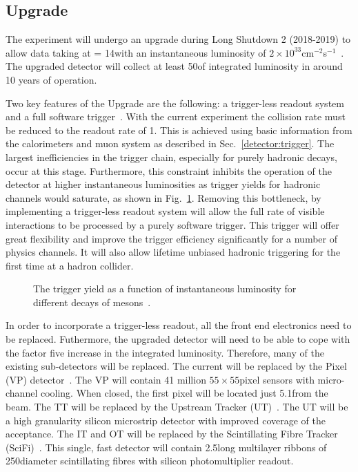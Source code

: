\subsection{\lhcb Upgrade}
\label{sec:lhcb:lhcb-upgrade}

The \lhcb experiment will undergo an upgrade during Long Shutdown 2 (2018-2019) to allow data taking at \sqs = 14\tev with an instantaneous luminosity of $2\times10^{33}$cm$^{-2}$s$^{-1}$~\cite{upgrade-loi,upgrade-tdr}. The upgraded detector will collect at least 50\invfb of integrated luminosity in around 10 years of operation.

Two key features of the \lhcb Upgrade are the following: a trigger-less readout system and a full software trigger~\cite{upgrade-trigger-tdr}. With the current experiment the collision rate must be reduced to the readout rate of 1\mhz. This is achieved using basic information from the calorimeters and muon system as described in Sec.~\ref{detector:trigger}. The largest inefficiencies in the trigger chain, especially for purely hadronic decays, occur at this stage. Furthermore, this constraint inhibits the operation of the detector at higher instantaneous luminosities as trigger yields for hadronic channels would saturate, as shown in Fig.~\ref{fig:upgrade-motivation}. Removing this bottleneck, by implementing a trigger-less readout system will allow the full rate of visible interactions to be processed by a purely software trigger. This trigger will offer great flexibility and improve the trigger efficiency significantly for a number of physics channels. It will also allow lifetime unbiased hadronic triggering for the first time at a hadron collider.

\begin{figure}[!htb]
\centering
{}
\caption{The trigger yield as a function of instantaneous luminosity for different decays of \B mesons~\cite{upgrade-loi}.}
\label{fig:upgrade-motivation}
\end{figure}

In order to incorporate a trigger-less readout, all the front end electronics need to be replaced. Futhermore, the upgraded detector will need to be able to cope with the factor five increase in the integrated luminosity. Therefore, many of the existing sub-detectors will be replaced. The current \velo will be replaced by the \velo Pixel (VP) detector~\cite{upgrade-velo-tdr}. The VP will contain 41 million $55\times55$\mum pixel sensors with micro-channel \cotwo cooling. When closed, the first pixel will be located just 5.1\mm from the \lhcb beam. The TT will be replaced by the Upstream Tracker (UT)~\cite{upgrade-tracker-tdr}. The UT will be a high granularity silicon microstrip detector with improved coverage of the \lhcb acceptance. The IT and OT will be replaced by the Scintillating Fibre Tracker (SciFi)~\cite{upgrade-tracker-tdr}. This single, fast detector will contain 2.5\m long multilayer ribbons of 250\mum diameter scintillating fibres with silicon photomultiplier readout.

